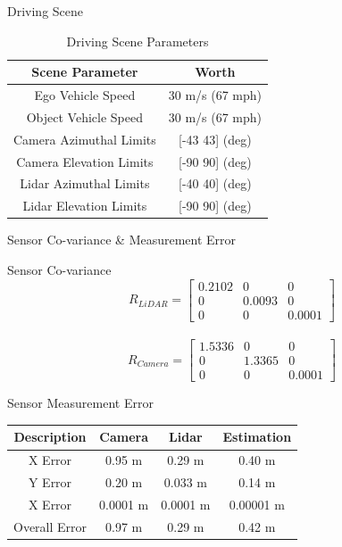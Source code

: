 \documentclass[10pt]{beamer}
\begin{document}
\begin{frame}{Driving Scene}
\begin{table}
    \centering
    \begin{tabular}{|c|c|}
        \hline
        \textbf{Scene Parameter} & \textbf{Worth} \\
        \hline
        Ego Vehicle Speed & 30 m/s (67 mph)\\
        \hline
        Object Vehicle Speed & 30 m/s (67 mph)\\
        \hline
        Camera Azimuthal Limits & [-43 43] (deg) \\
        \hline
        Camera Elevation Limits & [-90 90] (deg)\\
        \hline  
        Lidar Azimuthal Limits & [-40 40] (deg)\\
        \hline
        Lidar Elevation Limits & [-90 90] (deg)\\
        \hline
    \end{tabular}
    \caption{Driving Scene Parameters}
\end{table} 
\end{frame}

\begin{frame}{Sensor Co-variance \& Measurement Error}

\begin{block}{Sensor Co-variance}
    $$R_{LiDAR} = 
    \left[\begin{array}{ccc}
    0.2102 & 0 & 0 \\
    0 & 0.0093 & 0 \\
    0 & 0 & 0.0001
    \end{array}\right]$$ \\

    $$R_{Camera} =
    \left[\begin{array}{ccc}
    1.5336 & 0 & 0 \\
    0 & 1.3365 & 0 \\
    0 & 0 & 0.0001
    \end{array}\right]$$
\end{block}

\begin{block}{Sensor Measurement Error}
\begin{table}
    \centering
    \begin{tabular}{|c|c|c|c|}
        \hline
        \textbf{Description} & \textbf{Camera} & \textbf{Lidar} & \textbf{Estimation} \\
        \hline
        X Error & 0.95 m & 0.29 m & 0.40 m\\
        \hline
        Y Error & 0.20 m & 0.033 m & 0.14 m\\
        \hline
        X Error & 0.0001 m & 0.0001 m & 0.00001 m\\
        \hline
        Overall Error & 0.97 m & 0.29 m & 0.42 m\\
        \hline        
    \end{tabular}
\end{table}
\end{block}
\end{frame}
\end{document}
